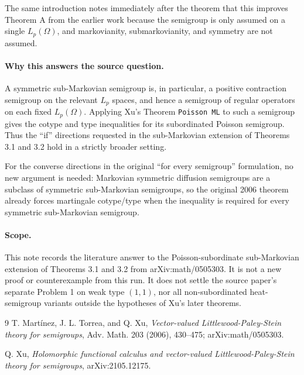 \documentclass[11pt]{article}
\begin{document}
The same introduction notes immediately after the theorem that this improves
Theorem A from the earlier work because the semigroup is only assumed on a
single $L_p(\Omega)$, and markovianity, submarkovianity, and symmetry are not
assumed.

\paragraph{Why this answers the source question.}
A symmetric sub-Markovian semigroup is, in particular, a positive contraction
semigroup on the relevant $L_p$ spaces, and hence a semigroup of regular
operators on each fixed $L_p(\Omega)$. Applying Xu's Theorem \texttt{Poisson
ML} to such a semigroup gives the cotype and type inequalities for its
subordinated Poisson semigroup. Thus the ``if'' directions requested in the
sub-Markovian extension of Theorems 3.1 and 3.2 hold in a strictly broader
setting.

For the converse directions in the original ``for every semigroup'' formulation,
no new argument is needed: Markovian symmetric diffusion semigroups are a
subclass of symmetric sub-Markovian semigroups, so the original 2006 theorem
already forces martingale cotype/type when the inequality is required for every
symmetric sub-Markovian semigroup.

\paragraph{Scope.}
This note records the literature answer to the Poisson-subordinate
sub-Markovian extension of Theorems 3.1 and 3.2 from arXiv:math/0505303. It is
not a new proof or counterexample from this run. It does not settle the source
paper's separate Problem 1 on weak type $(1,1)$, nor all non-subordinated
heat-semigroup variants outside the hypotheses of Xu's later theorems.

\begin{thebibliography}{9}
T. Mart\'inez, J. L. Torrea, and Q. Xu,
\emph{Vector-valued Littlewood-Paley-Stein theory for semigroups},
Adv. Math. 203 (2006), 430--475; arXiv:math/0505303.

Q. Xu,
\emph{Holomorphic functional calculus and vector-valued Littlewood-Paley-Stein theory for semigroups},
arXiv:2105.12175.
\end{thebibliography}
\end{document}
